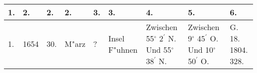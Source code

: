 \documentclass[a4paper, 8pt, oneside, polutonikogreek, german]{article}
\begin{document}
\subsubsection{}
\begin{table}[H]
    \centering
    \frakfamily
    \footnotesize
    \begin{longtable}{|l|l|l|l|l|l|p{13mm}|p{13mm}|p{13mm}|}
    \hline
        1. & 2. & 2. & 2. & 3. & 3. & 4. & 5. & 6. \\ \hline
        1. & 1654 & 30. & M"arz & ? & Insel F"uhnen & Zwischen 55$^\circ$ 2$^\prime$ N. Und 55$^\circ$ 38$^\prime$ N. & Zwischen 9$^\circ$ 45$^\prime$ O. Und 10$^\circ$ 50$^\prime$ O. & G. 18. 1804. 328. \\ \hline
    \end{longtable}
\end{table}
\clearpage
\end{document}
